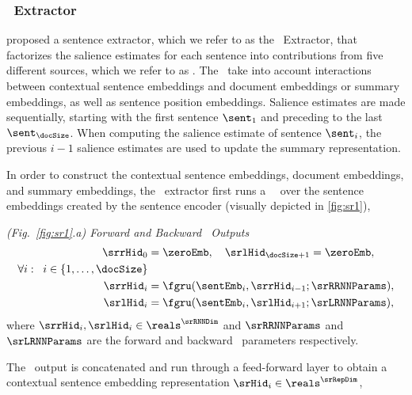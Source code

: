 
\subsubsection{\srext~Extractor}

\citet{nallapati2017summarunner} proposed
a sentence extractor, which we refer to as the \srext~Extractor,
that factorizes the salience estimates for each sentence into contributions 
from five different sources, which we refer to as \saliencefactors.
The \saliencefactors~take into account interactions between 
contextual sentence embeddings and document embeddings or summary embeddings,
as well as sentence position embeddings. Salience estimates are made sequentially, starting with the first sentence $\sent_1$ and preceding to the last $\sent_\docSize$. When computing the salience estimate of sentence $\sent_i$, 
the previous $i-1$ salience estimates are used to update the summary
representation.

In order to construct the contextual sentence embeddings, document 
embeddings, and summary embeddings, the \srext~extractor first runs 
a \bidirectional~\gru~over the sentence 
embeddings created by the sentence encoder (visually depicted in \autoref{fig:sr1}), 



%

\noindent \textit{(Fig.~\ref{fig:sr1}.a) Forward and Backward \gru~Outputs}
\begin{align}
    \srrHid_0 &= \zeroEmb, \quad \srlHid_{\docSize + 1} = \zeroEmb, \\
    \forall i : \;\; i \in \{1,\ldots,\docSize\}&\nonumber \\
    \srrHid_i &= \fgru(\sentEmb_i, \srrHid_{i-1}; \srRRNNParams), \\
    \srlHid_i &= \fgru(\sentEmb_i, \srlHid_{i+1}; \srLRNNParams),
\end{align}
where $\srrHid_i,\srlHid_i \in \reals^{\srRNNDim}$ and $\srRRNNParams$ and $\srLRNNParams$ are the forward and backward \gru~parameters respectively.



    The \gru~output is
concatenated and run through a feed-forward layer to obtain 
a contextual sentence embedding representation $\srHid_i \in \reals^{\srRepDim}$, 


